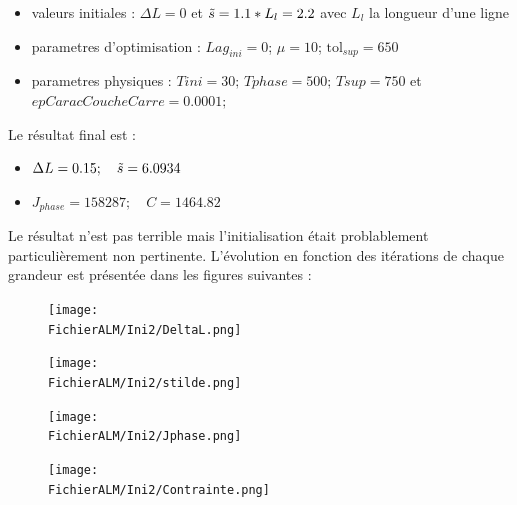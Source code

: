 \documentclass[11pt,a4paper]{article}
\begin{document}
\begin{itemize}
	\item valeurs initiales : $\Delta L=0$ et $\tilde{s}=1.1*L_l=2.2$ avec $L_l$ la longueur d'une ligne
	\item parametres d'optimisation : $Lag_{ini}=0$; $\mu=10$; $\textrm{tol}_{sup}=650$
	\item parametres physiques : $Tini=30;\,Tphase=500;\,Tsup=750$ et $epCaracCoucheCarre=0.0001;$
\end{itemize}

Le résultat final est :
\begin{itemize}
	\item $\Delta L= 0.15 ;\quad \tilde{s}=6.0934$
	\item $J_{phase}=158287;\quad C= 1464.82$
\end{itemize}

Le résultat n'est pas terrible mais l'initialisation était problablement particulièrement non pertinente.
L'évolution en fonction des itérations de chaque grandeur est présentée dans les figures suivantes :

\begin{figure}[H]
	\begin{minipage}{0.45\textwidth}
		\centering
		\texttt{[image: \\FichierALM/Ini2/DeltaL.png]}
	\end{minipage}
	\begin{minipage}{0.45\textwidth}
		\centering
		\texttt{[image: \\FichierALM/Ini2/stilde.png]}
	\end{minipage}	
\end{figure}

\begin{figure}[H]
	\begin{minipage}{0.45\textwidth}
		\centering
		\texttt{[image: \\FichierALM/Ini2/Jphase.png]}
	\end{minipage}
	\begin{minipage}{0.45\textwidth}
		\centering
		\texttt{[image: \\FichierALM/Ini2/Contrainte.png]}
	\end{minipage}	
\end{figure}

\setcounter{x}{0}
\end{document}
